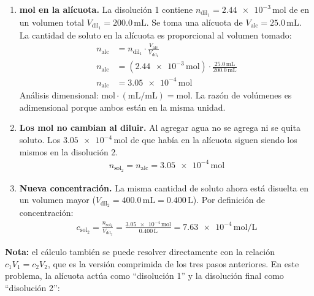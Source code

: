 \begin{exercise}{}{}
\begin{enumerate}
    \item \textbf{mol en la alícuota.} La disolución 1 contiene 
    $n_{\mathrm{dil_1}} = \num{2.44e-3}\,\mathrm{mol}$ de  
    en un volumen total $V_{\mathrm{dil_1}} = 200.0\,\mathrm{mL}$. Se toma una 
    alícuota de $V_{\mathrm{alc}} = 25.0\,\mathrm{mL}$. La cantidad de soluto en 
    la alícuota es proporcional al volumen tomado:
    \begin{align*}
        n_{\mathrm{alc}} &= n_{\mathrm{dil_1}} \cdot \frac{V_{\mathrm{alc}}}{V_{\mathrm{dil_1}}} \\[4pt]
        n_{\mathrm{alc}} &= (\num{2.44e-3}\,\mathrm{mol}) \cdot 
        \frac{25.0\,\mathrm{mL}}{200.0\,\mathrm{mL}} \\[4pt]
        n_{\mathrm{alc}} &= \num{3.05e-4}\,\mathrm{mol}
    \end{align*}
    Análisis dimensional: $\mathrm{mol} \cdot (\mathrm{mL}/\mathrm{mL}) = \mathrm{mol}$. 
    La razón de volúmenes es adimensional porque ambos están en la misma unidad.

    \item \textbf{Los mol no cambian al diluir.} Al agregar agua no se agrega ni 
    se quita soluto. Los $\num{3.05e-4}\,\mathrm{mol}$ de  
    que había en la alícuota siguen siendo los mismos en la disolución 2.
    \begin{align*}
        n_{\mathrm{sol_2}} = n_{\mathrm{alc}} = \num{3.05e-4}\,\mathrm{mol}
    \end{align*}

    \item \textbf{Nueva concentración.} La misma cantidad de soluto ahora está 
    disuelta en un volumen mayor ($V_{\mathrm{dil_2}} = 400.0\,\mathrm{mL} = 0.400\,\mathrm{L}$). 
    Por definición de concentración:
    \begin{align*}
        c_{\mathrm{sol_2}} = \frac{n_{\mathrm{sol_2}}}{V_{\mathrm{dil_2}}}
        = \frac{\num{3.05e-4}\,\mathrm{mol}}{0.400\,\mathrm{L}}
        = \num{7.63e-4}\,\mathrm{mol/L}
    \end{align*}
\end{enumerate}

\textbf{Nota:} el cálculo también se puede resolver directamente con la relación 
$c_1 V_1 = c_2 V_2$, que es la versión comprimida de los tres pasos anteriores. 
En este problema, la alícuota actúa como ``disolución 1'' y la disolución final 
como ``disolución 2'':


\end{exercise}
